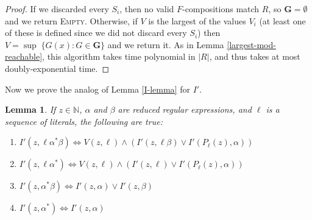 \documentclass[11pt]{amsart}
\newcommand{\N}{\mathbb{N}}
\newtheorem{lemma}{Lemma}
\theoremstyle{definition}
\theoremstyle{remark}
\begin{document}
\begin{proof}
If we discarded every $S_i$, then no valid $F$-compositions match $R$, so $\mathbf{G} = \emptyset$ and we return \textsc{Empty}. Otherwise, if $V$ is the largest of the values $V_i$ (at least one of these is defined since we did not discard every $S_i$) then $V = \sup \; \{ G(x) : G \in \mathbf{G} \}$ and we return it. As in Lemma \ref{largest-mod-reachable}, this algorithm takes time polynomial in $|R|$, and thus takes at most doubly-exponential time.
\end{proof}

Now we prove the analog of Lemma \ref{I-lemma} for $I'$.

\begin{lemma} \label{n-I-lemma}
If $z \in \N$, $\alpha$ and $\beta$ are reduced regular expressions, and $\ell$ is a sequence of literals, the following are true:
\begin{enumerate}
\item $I'(z, \ell \alpha^* \beta) \iff V(z, \ell) \land (I'(z, \ell \beta) \lor I'(P_\ell(z), \alpha))$ \label{n-I-lemma-literal-star-prefix}
\item $I'(z, \ell \alpha^*) \iff V(z, \ell) \land (I'(z, \ell) \lor I'(P_\ell(z), \alpha))$ \label{n-I-lemma-literal-star}
\item $I'(z, \alpha^* \beta) \iff I'(z, \alpha) \lor I'(z, \beta)$ \label{n-I-lemma-star-prefix}
\item $I'(z, \alpha^*) \iff I'(z,\alpha)$ \label{n-I-lemma-star}
\end{enumerate}
\end{lemma}
\end{document}
